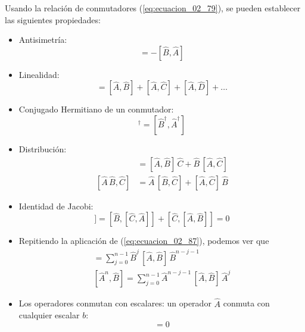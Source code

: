 Usando la relación de conmutadores (\ref{eq:ecuacion_02_79}), se pueden establecer las siguientes propiedades:
\begin{itemize}
\item Antisimetría:
\begin{equation}
[\hat{A}, \hat{B}] = - [\hat{B}, \hat{A}]
\label{eq:ecuacion_02_84}
\end{equation}
\item Linealidad:
\begin{equation}
[\hat{A} + \hat{B} + \hat{C} + \hat{D} + \ldots] = [\hat{A} , \hat{B}] + [\hat{A} , \hat{C}] + [\hat{A} , \hat{D}] + \ldots
\label{eq:ecuacion_02_85} 
\end{equation}
\item Conjugado Hermitiano de un conmutador:
\begin{equation}
[\hat{A}, \hat{B}]^{\dagger} = [\hat{B}^{\dagger}, \hat{A}^{\dagger}]
\label{eq:ecuacion_02_86}
\end{equation}
\item Distribución:
\begin{align}
[\hat{A},  \hat{B} \, \hat{C}] &= [\hat{A} , \hat{B}] \,  \hat{C} + \hat{B} \, [\hat{A} , \hat{C}]
\label{eq:ecuacion_02_87} \\[1em]
[\hat{A} \, \hat{B} , \hat{C}] &= \hat{A} \,[ \hat{B} ,  \hat{C}] + [\hat{A} , \hat{C}] \, \hat{B}
\label{eq:ecuacion_02_88}
\end{align}
\item Identidad de Jacobi:
\begin{equation}
[\hat{A},  [\hat{B} , \hat{C}]] = [\hat{B}, [\hat{C} , \hat{A}]] + [\hat{C},  [\hat{A} , \hat{B}]] = 0
\label{eq:ecuacion_02_89}
\end{equation}
\item Repitiendo la aplicación de (\ref{eq:ecuacion_02_87}), podemos ver que
\begin{align}
[\hat{A},  \hat{B}^{n}] = \sum_{j=0}^{n-1} \hat{B}^{j} \, [\hat{A},  \hat{B}] \, \hat{B}^{n-j-1} \label{eq:ecuacion_02_90} \\
[\hat{A}^{n},  \hat{B}] = \sum_{j=0}^{n-1} \hat{A}^{n-j-1} \, [\hat{A},  \hat{B}] \, \hat{A}^{j} \label{eq:ecuacion_02_91}
\end{align}
\item Los operadores conmutan con escalares: un operador $\hat{A}$ conmuta con cualquier escalar $b$:
\begin{equation}
[ \hat{A}, b ] = 0
\label{eq:ecuacion_02_92}
\end{equation}
\end{itemize}
